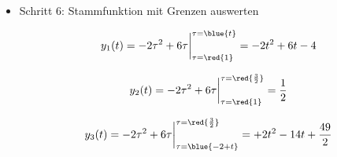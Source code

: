 \begin{ExCalc}
\begin{itemize}

  \item Schritt 6:  Stammfunktion mit Grenzen auswerten

  \begin{equation}
  y_1(t) = -2 \tau^2 +6 \tau\bigg|_{\tau=\red{1}}^{\tau=\blue{t}}
  = -2 t^2 + 6 t - 4
  \end{equation}

  \begin{equation}
  y_2(t) = -2 \tau^2 +6 \tau\bigg|_{\tau=\red{1}}^{\tau=\red{\frac{3}{2}}}  = \frac{1}{2}
  \end{equation}

  \begin{equation}
  y_3(t) = -2 \tau^2 +6 \tau\bigg|_{\tau=\blue{-2+t}}^{\tau=\red{\frac{3}{2}}} = +2 t^2 - 14 t + \frac{49}{2}
  \end{equation}

\end{itemize}
\end{ExCalc}

